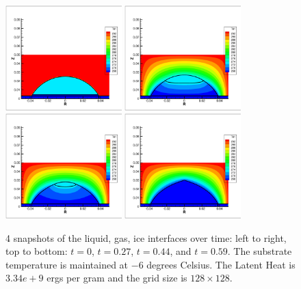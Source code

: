 \documentclass[]{article}
\begin{document}
\begin{figure}[htbp]
\centering
\includegraphics[width=0.4\textwidth]{freezing0000May2023.eps} 
\includegraphics[width=0.4\textwidth]{freezing3200May2023.eps}  \\
\includegraphics[width=0.4\textwidth]{freezing5200May2023.eps}  
\includegraphics[width=0.4\textwidth]{freezing6800May2023.eps}  
\caption{
 4 snapshots of the liquid, gas, ice interfaces over time: left to right,
 top to bottom: $t=0$, $t=0.27$, $t=0.44$, and $t=0.59$.
 The substrate temperature is maintained at $-6$ degrees Celsius. 
 The Latent Heat is $3.34e+9$ ergs per gram and
 the grid size is $128\times 128$.
}
\label{freezing_frames}
\end{figure}
\end{document}
